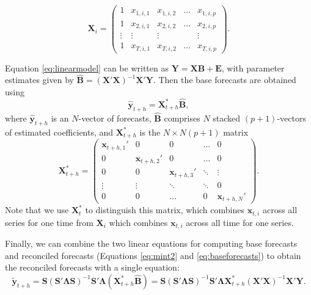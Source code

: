 \documentclass[11pt,a4paper,]{article}
\begin{document}
\begin{equation}\label{eq:Xmatrixdefinition}
  \bm{X}_i = \begin{pmatrix}
  1 & x_{1,i,1} & x_{1,i,2} & \dots & x_{1,i,p}\\
  1 & x_{2,i,1} & x_{2,i,2} & \dots & x_{2,i,p}\\
  \vdots & \vdots & \vdots & & \vdots \\
  1 & x_{T,i,1} & x_{T,i,2} & \dots & x_{T,i,p}
\end{pmatrix}.
\end{equation}

Equation \eqref{eq:linearmodel} can be written as \(\bm{Y} = \bm{X} \bm{B} + \bm{E}\), with parameter estimates given by \(\hat{\bm{B}} = (\bm{X}'\bm{X})^{-1} \bm{X}'\bm{Y}\). Then the base forecasts are obtained using
\begin{equation}\label{eq:baseforecasts}
  \hat{\bm{y}}_{t+h} = \bm{X}_{t+h}^* \hat{\bm{B}},
\end{equation}
where \(\hat{\bm{y}}_{t+h}\) is an \(N\)-vector of forecasts, \(\hat{\bm{B}}\) comprises \(N\) stacked \((p+1)\)-vectors of estimated coefficients, and \(\bm{X}_{t+h}^*\) is the \(N\times N(p+1)\) matrix
\pagebreak[3]\begin{equation}
  \bm{X}_{t+h}^* =
  \begin{pmatrix}
  \bm{x}_{t+h,1}' & 0               & 0               & \dots  & 0\\
  0               & \bm{x}_{t+h,2}' & 0               & \dots  & 0\\
  0               & 0               & \bm{x}_{t+h,3}' & \ddots & \vdots \\
  \vdots          & \vdots          & \ddots          & \ddots & 0\\
  0               & 0               & \dots           & 0      & \bm{x}_{t+h,N}'
  \end{pmatrix}.
\end{equation}
Note that we use \(\bm{X}^*_{t}\) to distinguish this matrix, which combines \(\bm{x}_{t,i}\) across all series for one time from \(\bm{X}_i\) which combines \(\bm{x}_{t,i}\) across all time for one series.

Finally, we can combine the two linear equations for computing base forecasts and reconciled forecasts (Equations \eqref{eq:mint2} and \eqref{eq:baseforecasts}) to obtain the reconciled forecasts with a single equation:
\begin{equation}\label{eq:singlestep}
    \tilde{\bm{y}}_{t+h} = \bm{S}(\bm{S}'\bm{\Lambda}\bm{S})^{-1}\bm{S}'\bm{\Lambda}
                            (\bm{X}_{t+h}^* \hat{\bm{B}})
                         = \bm{S}(\bm{S}'\bm{\Lambda}\bm{S})^{-1}\bm{S}'\bm{\Lambda}
                            \bm{X}_{t+h}^* (\bm{X}'\bm{X})^{-1} \bm{X}'\bm{Y}.
\end{equation}
\end{document}
